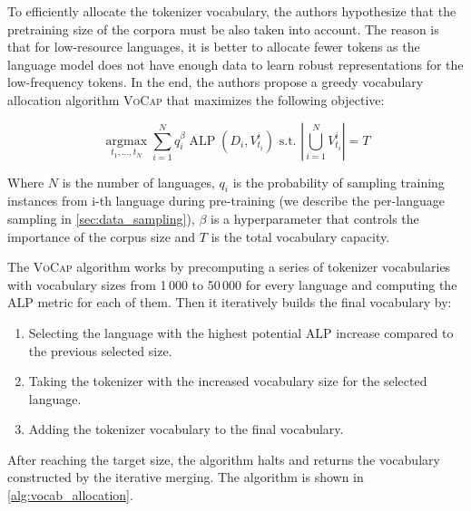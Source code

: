 
To efficiently allocate the tokenizer vocabulary, the authors hypothesize that the pretraining size of the corpora must be also taken into account. The reason is that for low-resource languages, it is better to allocate fewer tokens as the language model does not have enough data to learn robust representations for the low-frequency tokens. In the end, the authors propose a greedy vocabulary allocation algorithm \textsc{VoCap} that maximizes the following objective:

$$
\underset{t_1, \ldots, t_N}{\operatorname{argmax}} \sum_{i=1}^N q_i^\beta \operatorname{ALP}\left(D_i, V_{t_i}^i\right) \text { s.t. }\left|\bigcup_{i=1}^N V_{t_i}^i\right|=T
$$

Where $N$ is the number of languages, $q_i$ is the probability of sampling training instances from i-th language during pre-training (we describe the per-language sampling in \autoref{sec:data_sampling}), $\beta$ is a hyperparameter that controls the importance of the corpus size and $T$ is the total vocabulary capacity. 

The \textsc{VoCap} algorithm works by precomputing a series of tokenizer vocabularies with vocabulary sizes from 1\,000 to 50\,000 for every language and computing the ALP metric for each of them. Then it iteratively builds the final vocabulary by:

\begin{enumerate}
    \item Selecting the language with the highest potential ALP increase compared to the previous selected size.
    \item Taking the tokenizer with the increased vocabulary size for the selected language.
    \item Adding the tokenizer vocabulary to the final vocabulary.
\end{enumerate}

After reaching the target size, the algorithm halts and returns the vocabulary constructed by the iterative merging. The algorithm is shown in \autoref{alg:vocab_allocation}.

